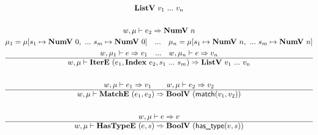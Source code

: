 \begin{gather*}
  \listv ~ v_1 ~ ... ~ v_n \\
%
\newline \\
  w, \mu \vdash e_2 \Rightarrow \numv ~ n \\
  \mu_1 = \mu[s_1 \mapsto \numv ~ 0, ~ ... ~ s_m \mapsto \numv ~ 0] \quad ... \quad
  \mu_n = \mu[s_1 \mapsto \numv ~ n, ~ ... ~ s_m \mapsto \numv ~ n] \\
  w, \mu_1 \vdash e \Rightarrow v_1 \quad ... \quad
  w, \mu_n \vdash e \Rightarrow v_n \\
  \hline
  w, \mu \vdash \itere ~ (e_1, \listidxiter ~ e_2, s_1 ~ ... ~ s_m) \Rightarrow
  \listv ~ v_1 ~ ... ~ v_n \\
%
\newline \\
  w, \mu \vdash e_1 \Rightarrow v_1 \qquad
  w, \mu \vdash e_2 \Rightarrow v_2 \\
  \hline
  w, \mu \vdash \matche ~ (e_1, e_2) \Rightarrow \boolv ~ (\match(v_1, v_2)) \\
%
\newline \\
  w, \mu \vdash e \Rightarrow v \\
  \hline
  w, \mu \vdash \hastypee ~ (e, s) \Rightarrow \boolv ~ (\hastype(v, s)) \\
\end{gather*}

